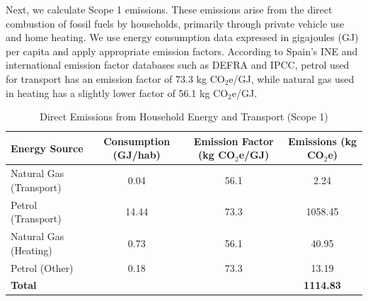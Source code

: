 \documentclass[12pt,a4paper]{article}%
\begin{document}
\begin{table}[h]
\centering
\caption{Mean Consumption Expenditure per Household in Spain, 2022}\label{tab:expenditure}
\end{table}

Next, we calculate Scope 1 emissions. These emissions arise from the direct combustion of fossil fuels by households, primarily through private vehicle use and home heating. We use energy consumption data expressed in gigajoules (GJ) per capita and apply appropriate emission factors. According to Spain’s INE and international emission factor databases such as DEFRA and IPCC, petrol used for transport has an emission factor of 73.3 kg CO$_2$e/GJ, while natural gas used in heating has a slightly lower factor of 56.1 kg CO$_2$e/GJ.

\begin{table}[h]
\centering
\caption{Direct Emissions from Household Energy and Transport (Scope 1)}\label{tab:scope1}
\begin{tabular}{|l|c|c|c|}
\hline
\textbf{Energy Source} & \textbf{Consumption (GJ/hab)} & \textbf{Emission Factor (kg CO$_2$e/GJ)} & \textbf{Emissions (kg CO$_2$e)} \\
\hline
Natural Gas (Transport) & 0.04 & 56.1 & 2.24 \\
Petrol (Transport) & 14.44 & 73.3 & 1058.45 \\
Natural Gas (Heating) & 0.73 & 56.1 & 40.95 \\
Petrol (Other) & 0.18 & 73.3 & 13.19 \\
\hline
\textbf{Total} & & & \textbf{1114.83} \\
\hline
\end{tabular}
\end{table}
\end{document}
